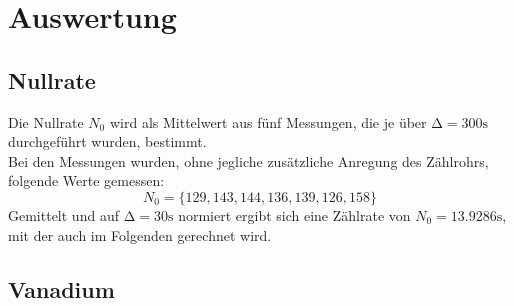 \newpage
\section{Auswertung}

\subsection{Nullrate}

Die Nullrate $N_0$ wird als Mittelwert aus fünf Messungen, die je über $\increment=300\si{\second}$ durchgeführt wurden, bestimmt.\\
Bei den Messungen wurden, ohne jegliche zusätzliche Anregung des Zählrohrs, folgende Werte gemessen:
\begin{equation*}
    N_0 = \{129, 143, 144, 136, 139, 126, 158 \}
\end{equation*}
Gemittelt und auf $\increment=30\si{\second}$ normiert ergibt sich eine Zählrate von $N_0= 13.9286\si{\second}$, mit der auch im Folgenden gerechnet wird.\\


\subsection{Vanadium}


